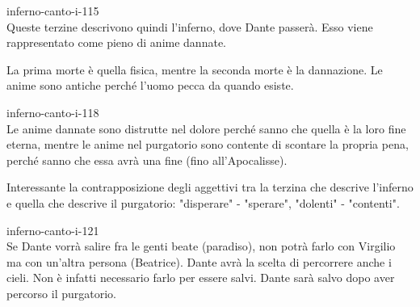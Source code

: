 \documentclass[preview]{standalone}
\begin{document}
\begin{snippet}{inferno-canto-i-115}
    \\
    Queste terzine descrivono quindi l'inferno, dove Dante passerà.
    Esso viene rappresentato come pieno di anime dannate.
    
    La prima morte è quella fisica, mentre la seconda morte è la dannazione.
    Le anime sono antiche perché l'uomo pecca da quando esiste.
\end{snippet}

\begin{snippet}{inferno-canto-i-118}
    \\
    Le anime dannate sono distrutte nel dolore perché sanno che quella è la loro
    fine eterna, mentre le anime nel purgatorio sono contente di scontare la propria pena,
    perché sanno che essa avrà una fine (fino all'Apocalisse).
\end{snippet}    

\begin{plainhtml}
    Interessante la contrapposizione degli aggettivi tra la terzina che descrive l'inferno e quella che 
    descrive il purgatorio: "disperare" - "sperare", "dolenti" - "contenti".
\end{plainhtml}

\begin{snippet}{inferno-canto-i-121}
    \\
    Se Dante vorrà salire fra le genti beate (paradiso), non potrà farlo con Virgilio
    ma con un'altra persona (Beatrice).
    Dante avrà la scelta di percorrere anche i cieli. Non è infatti necessario
    farlo per essere salvi. Dante sarà salvo dopo aver percorso il purgatorio.
\end{snippet}
\end{document}
